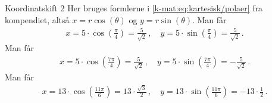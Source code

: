\begin{opgave}[1]{Koordinatskift 2}
Her bruges formlerne i \cref{k-mat:eq:kartesisk/polaer} fra kompendiet, altså $x = r \cos(\theta)$ og $y = r \sin(\theta)$.
\opg Man får
\begin{align*}
x = 5 \cdot \cos\left( \frac{\pi}{4} \right) = \frac{5}{\sqrt{2}} \, , \quad y = 5 \cdot \sin\left(\frac{\pi}{4}\right) = \frac{5}{\sqrt{2}} \, .
\end{align*}
\opg Man får
\begin{align*}
x = 5 \cdot \cos\left(\frac{7\pi}{4}\right) =  \frac{5}{\sqrt{2}} \, , \quad y = 5 \cdot \sin\left(\frac{7\pi}{4}\right) = - \frac{5}{\sqrt{2}} \, .
\end{align*}
\opg Man får
\begin{align*}
x = 13 \cdot \cos\left(\frac{11\pi}{6}\right) = 13 \cdot \frac{\sqrt{3}}{2} \, , \quad y = 13 \cdot \sin\left(\frac{11\pi}{6}\right) =  -13 \cdot \frac{1}{2} \, .
\end{align*}
\end{opgave}
